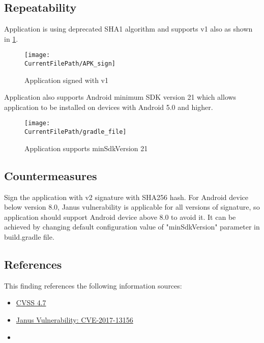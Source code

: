 \newpage


\subsection*{Repeatability}

Application is using deprecated SHA1 algorithm and supports v1 also as shown in \cref{figure:APK_sign}. 

\begin{figure}[H]
\centering
\texttt{[image: \\CurrentFilePath/APK\_sign]}
\caption{Application signed with v1}
\label{figure:APK_sign}
\end{figure}

\pagebreak
Application also supports Android minimum SDK version 21 which allows application to be installed on devices with Android 5.0 and higher.
\begin{figure}[H]
\centering
\texttt{[image: \\CurrentFilePath/gradle\_file]}
\caption{Application supports minSdkVersion 21}
\label{figure:gradle_file}
\end{figure}





\subsection*{Countermeasures}

Sign the application with v2 signature with SHA256 hash. For Android device below version 8.0, Janus vulnerability is applicable for all versions of signature, so application should support Android device above 8.0 to avoid it. It can be achieved by changing default configuration value of "minSdkVersion" parameter in build.gradle file.




\subsection*{References}

This finding references the following information sources:

\begin{itemize}
	\item \href{https://www.first.org/cvss/calculator/3.1#CVSS:3.1/AV:L/AC:H/PR:L/UI:N/S:U/C:N/I:H/A:N}
	{CVSS 4.7}
	\item \href{https://nvd.nist.gov/vuln/detail/CVE-2017-13156}
	{Janus Vulnerability: CVE-2017-13156}
	\item {}
\end{itemize}





